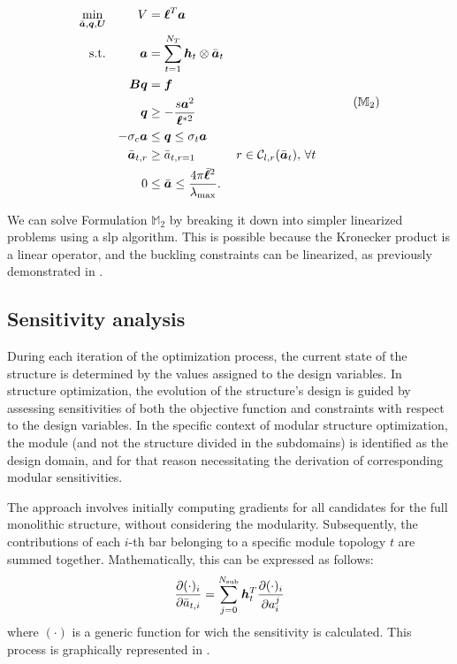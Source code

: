 \begin{equation}
    \begin{aligned}
    \min_{\bar{\vect{a}}, \vect{q}, \vect{U}}   && V &= \vect{\ell}^{T}\vect{a}\\
    \textrm{s.t.}  && \vect{a} &= \sum_{t=1}^{N_T} \vect{h}_t\otimes\bar{\vect{a}}_t \\ 
    && \matr{B}\vect{q} &= \vect{f} && \\
    && \vect{q} &\geq -\frac{s\vect{a}^2}{\vect{\ell}^{*2}} &&  \\
    && -\sigma_c\vect{a} &\leq \vect{q} \leq \sigma_t\vect{a} &&  \\
    && \bar{\vect{a}}_{t,r}&\geq \bar{a}_{t,r=1} && r \in \mathcal{C}_{l,r}(\bar{\vect{a}}_t),\, \forall t \\
    && 0 &\leq \bar{\vect{a}} \leq \frac{4 \pi \bar{\vect{\ell}}^2}{\lambda_{\text{max}}}. \\
    \end{aligned}
    \tag{${\mathbb{M}}_\text{2}$}
    \label{eq:05_optim_no_constr_modular}
\end{equation}

We can solve Formulation $\mathbb{M}_2$ by breaking it down into simpler linearized problems using a \gls{slp} algorithm. This is possible because the Kronecker product is a linear operator, and the buckling constraints can be linearized, as previously demonstrated in .

\subsection{Sensitivity analysis}
During each iteration of the optimization process, the current state of the structure is determined by the values assigned to the design variables. In structure optimization, the evolution of the structure's design is guided by assessing sensitivities of both the objective function and constraints with respect to the design variables. In the specific context of modular structure optimization, the module (and not the structure divided in the subdomains) is identified as the design domain, and for that reason necessitating the derivation of corresponding modular sensitivities.

The approach involves initially computing gradients for all candidates for the full monolithic structure, without considering the modularity. Subsequently, the contributions of each $i$-th bar belonging to a specific module topology $t$ are summed together. Mathematically, this can be expressed as follows:
\begin{equation}
    \frac{\partial(\cdot)_i}{\partial\bar{a}_{t,i}} =  \sum_{j=0}^{N_\text{sub}} \bm{h}_t^T \frac{\partial(\cdot)_i}{\partial a^j_i} 
    \label{eq:05_VL_grad}
\end{equation}
where $(\cdot)$ is a generic function for wich the sensitivity is calculated. This process is graphically represented in .

